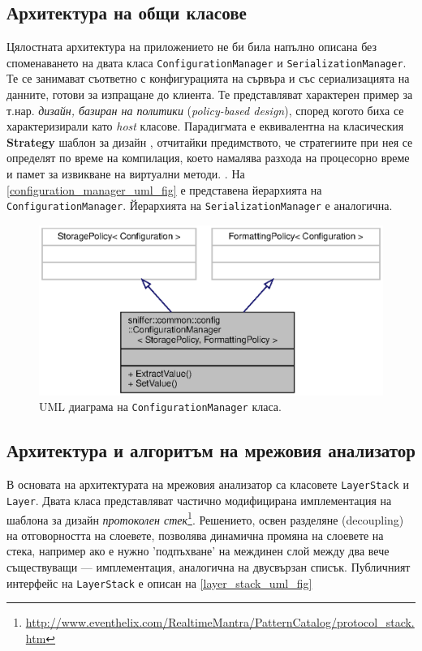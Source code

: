 \documentclass[12pt,a4paper,oneside]{book}
\begin{document}
\subsection{Архитектура на общи класове}

Цялостната архитектура на приложението не би била напълно описана без
споменаването на двата класа \texttt{ConfigurationManager} и
\texttt{SerializationManager}. Те се
занимават съответно с конфигурацията на сървъра и със сериализацията на данните,
готови за изпращане до клиента. Те представляват характерен пример за т.нар.
\textit{дизайн, базиран на политики} (\textit{policy-based design}),
според когото биха се характеризирали като \textit{host} класове.  Парадигмата е
еквивалентна на класическия \textbf{Strategy} шаблон за дизайн \cite{gamma_design_1995},
отчитайки предимството, че стратегиите
при нея се определят по време на компилация, което намалява разхода на
процесорно време и памет за извикване на виртуални методи.
\cite{alexandrescu_modern_2001}.  На \autoref{configuration_manager_uml_fig} е
представена йерархията на \texttt{ConfigurationManager}. Йерархията на
\texttt{SerializationManager} е аналогична.

\begin{figure}[h!]
  \centering
  \includegraphics[scale=.7]{figures/configuration_manager_uml.eps}
  \caption{UML диаграма на \texttt{ConfigurationManager} класа.}
  \label{configuration_manager_uml_fig}
\end{figure}

\subsection{Архитектура и алгоритъм на мрежовия анализатор}

В основата на архитектурата на мрежовия анализатор са класовете
\texttt{LayerStack} и \texttt{Layer}. Двата класа представляват частично
модифицирана имплементация на шаблона за дизайн
\textit{протоколен стек}\footnote{\url{http://www.eventhelix.com/RealtimeMantra/PatternCatalog/protocol_stack.htm}}.
Решението, освен разделяне (decoupling) на
отговорността на слоевете, позволява динамична промяна на слоевете на стека,
например ако е нужно 'подпъхване' на междинен слой между два вече съществуващи
--- имплементация, аналогична на двусвързан списък.
Публичният интерфейс на \texttt{LayerStack} е описан на
\autoref{layer_stack_uml_fig}
\end{document}

